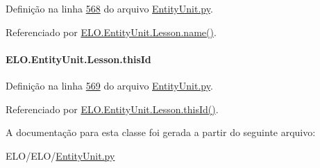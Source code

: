 Definição na linha \hyperlink{EntityUnit_8py_source_l00568}{568} do arquivo \hyperlink{EntityUnit_8py_source}{Entity\-Unit.\-py}.



Referenciado por \hyperlink{classELO_1_1EntityUnit_1_1Lesson_a5af62a54f008a391543fd8fabf30edcf}{E\-L\-O.\-Entity\-Unit.\-Lesson.\-name()}.

\hypertarget{classELO_1_1EntityUnit_1_1Lesson_a2ec9bd43b6b7ac7c7d00469c9f586271}{
\paragraph[{this\-Id}]{\setlength{\rightskip}{0pt plus 5cm}E\-L\-O.\-Entity\-Unit.\-Lesson.\-this\-Id}}\label{classELO_1_1EntityUnit_1_1Lesson_a2ec9bd43b6b7ac7c7d00469c9f586271}


Definição na linha \hyperlink{EntityUnit_8py_source_l00569}{569} do arquivo \hyperlink{EntityUnit_8py_source}{Entity\-Unit.\-py}.



Referenciado por \hyperlink{classELO_1_1EntityUnit_1_1Lesson_a1947d2d6413e7e94c8c524efe271af12}{E\-L\-O.\-Entity\-Unit.\-Lesson.\-this\-Id()}.



A documentação para esta classe foi gerada a partir do seguinte arquivo\-:\begin{DoxyCompactItemize}
\item 
E\-L\-O/\-E\-L\-O/\hyperlink{EntityUnit_8py}{Entity\-Unit.\-py}\end{DoxyCompactItemize}

